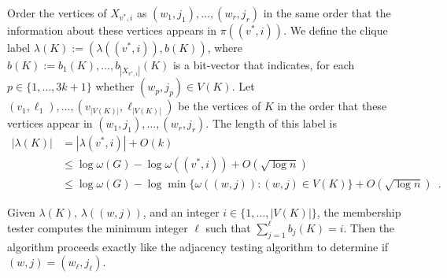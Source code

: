 \documentclass{patmorin}
\DeclareMathOperator{\depth}{depth}
\renewcommand{\le}{\leqslant}
\newcommand{\defin}[1]{\emph{\textcolor{brightmaroon}{#1}}}
\begin{document}
  Order the vertices of $X_{v^*,i}$ as $(w_1,j_1),\ldots,(w_{r},j_r)$ in the same order that the information about these vertices appears in $\pi((v^*,i))$.
  We define the clique label $\lambda(K):=(\lambda((v^*,i)), b(K))$, where $b(K):=b_1(K),\ldots,b_{|X_{v^*,i}|}(K)$ is a bit-vector that indicates, for each $p\in\{1,\ldots,3k+1\}$ whether $(w_p,j_p)\in V(K)$.  Let $(v_1,\ell_1),\ldots,(v_{|V(K)|},\ell_{|V(K)|})$ be the vertices of $K$ in the order that these vertices appear in $(w_1,j_1),\ldots,(w_{r},j_r)$.  The length of this label is
  \begin{align*}
     |\lambda(K)|
     & = |\lambda(v^*,i)| + O(k) \\
     & \le \log\omega(G) - \log\omega((v^*,i)) + O(\sqrt{\log n}) \\
     & \le \log\omega(G) - \log\min\{\omega((w,j)):(w,j)\in V(K)\} + O(\sqrt{\log n})  \enspace .
  \end{align*}

  Given $\lambda(K)$, $\lambda((w,j))$, and an integer $i\in\{1,\ldots,|V(K)|\}$, the membership tester computes the minimum integer $\ell$ such that $\sum_{j=1}^\ell b_j(K)=i$.  Then the algorithm proceeds exactly like the adjacency testing algorithm to determine if $(w,j)=(w_\ell,j_\ell)$.



\end{document}
